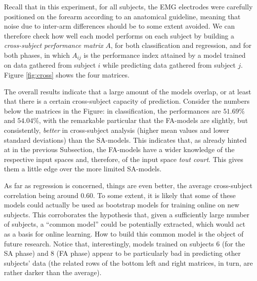 \documentclass[10pt]{bmc_article}
\newenvironment{bmcformat}{\begin{raggedright}\baselineskip20pt\sloppy\setboolean{publ}{false}}{\end{raggedright}\baselineskip20pt\sloppy}
\begin{document}
\begin{bmcformat}
Recall that in this experiment, for all subjects, the EMG electrodes
were carefully positioned on the forearm according to an anatomical
guideline, meaning that noise due to inter-arm differences should be
to some extent avoided. We can therefore check how well each model
performs on each subject by building a \emph{cross-subject performance
matrix} $A$, for both classification and regression, and for both phases,
in which $A_{ij}$ is the performance index attained by a model trained
on data gathered from subject $i$ while predicting data gathered from
subject $j$. Figure \ref{fig:cross} shows the four matrices.


The overall results indicate that a large amount of the models
overlap, or at least that there is a certain cross-subject capacity of
prediction. Consider the numbers below the matrices in the Figure: in
classification, the performances are $51.69\%$ and $54.04\%$, with the
remarkable particular that the FA-models are slightly, but
consistently, \emph{better} in cross-subject analysis (higher mean
values and lower standard deviations) than the SA-models. This
indicates that, as already hinted at in the previous Subsection, the
FA-models have a wider knowledge of the respective input spaces and,
therefore, of the input space \emph{tout court}. This gives them a
little edge over the more limited SA-models.

As far as regression is concerned, things are even better, the average
cross-subject correlation being around $0.60$. To some extent, it is
likely that some of these models could actually be used as bootstrap
models for training online on new subjects. This corroborates the
hypothesis that, given a sufficiently large number of subjects, a
``common model'' could be potentially extracted, which would act as a
basis for online learning. How to build this common model is the
object of future research. Notice that, interestingly, models trained
on subjects $6$ (for the SA phase) and $8$ (FA phase) appear to be
particularly bad in predicting other subjects' data (the related rows
of the bottom left and right matrices, in turn, are rather darker than
the average).


\end{bmcformat}
\end{document}
